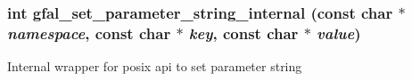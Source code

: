 \subsubsection{\setlength{\rightskip}{0pt plus 5cm}int gfal\_\-set\_\-parameter\_\-string\_\-internal (const char $\ast$ {\em namespace}, const char $\ast$ {\em key}, const char $\ast$ {\em value})}\label{gfal__posix__parameters_8c_23635b7c02de0165acdc8b68880a4e87}


Internal wrapper for posix api to set parameter string 